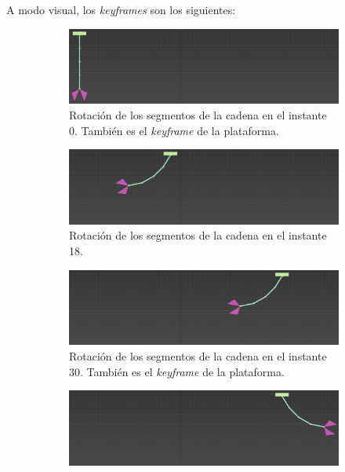 \documentclass{article}
\begin{document}
A modo visual, los \textit{keyframes} son los siguientes:
\begin{figure}[H]
    \centering
    \begin{subfigure}[H]{0.48\textwidth}
        \centering
        \includegraphics[width=\textwidth]{imagenes/Ejercicio4/keyframes/0.png}
        \caption{Rotación de los segmentos de la cadena en el instante 0. También es el \textit{keyframe} de la plataforma.}
    \end{subfigure}
    \hfill
    \begin{subfigure}[H]{0.48\textwidth}
        \centering
        \includegraphics[width=\textwidth]{imagenes/Ejercicio4/keyframes/18.png}
        \caption{Rotación de los segmentos de la cadena en el instante 18.}
    \end{subfigure}
    \par\bigskip
    \begin{subfigure}[H]{0.48\textwidth}
        \centering
        \includegraphics[width=\textwidth]{imagenes/Ejercicio4/keyframes/30.png}
        \caption{Rotación de los segmentos de la cadena en el instante 30. También es el \textit{keyframe} de la plataforma.}
    \end{subfigure}
    \hfill
    \begin{subfigure}[H]{0.48\textwidth}
        \centering
        \includegraphics[width=\textwidth]{imagenes/Ejercicio4/keyframes/47.png}

\end{subfigure}
\end{figure}
\end{document}
